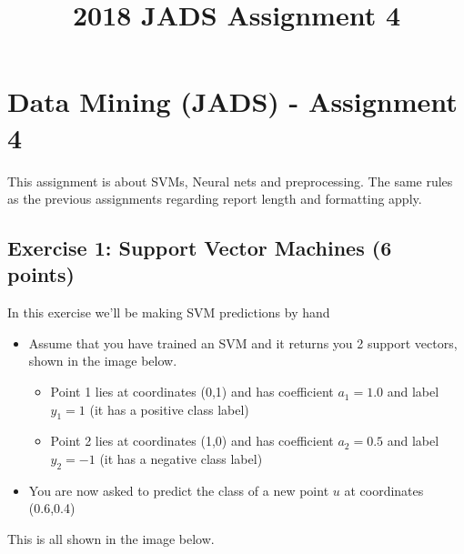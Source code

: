 \documentclass[11pt]{article}
\title{2018 JADS Assignment 4 }
\providecommand{\tightlist}{%
      \setlength{\itemsep}{0pt}\setlength{\parskip}{0pt}}
\begin{document}
    
    
    \maketitle
    
    

    
    \section{Data Mining (JADS) - Assignment
4}\label{data-mining-jads---assignment-4}

This assignment is about SVMs, Neural nets and preprocessing. The same
rules as the previous assignments regarding report length and formatting
apply.

    \subsection{Exercise 1: Support Vector Machines (6
points)}\label{exercise-1-support-vector-machines-6-points}

In this exercise we'll be making SVM predictions by hand

\begin{itemize}
\tightlist
\item
  Assume that you have trained an SVM and it returns you 2 support
  vectors, shown in the image below.

  \begin{itemize}
  \tightlist
  \item
    Point 1 lies at coordinates (0,1) and has coefficient \(a_1 = 1.0\)
    and label \(y_1=1\) (it has a positive class label)
  \item
    Point 2 lies at coordinates (1,0) and has coefficient \(a_2 = 0.5\)
    and label \(y_2=-1\) (it has a negative class label)
  \end{itemize}
\item
  You are now asked to predict the class of a new point \(u\) at
  coordinates (0.6,0.4)
\end{itemize}

This is all shown in the image below.
\end{document}

